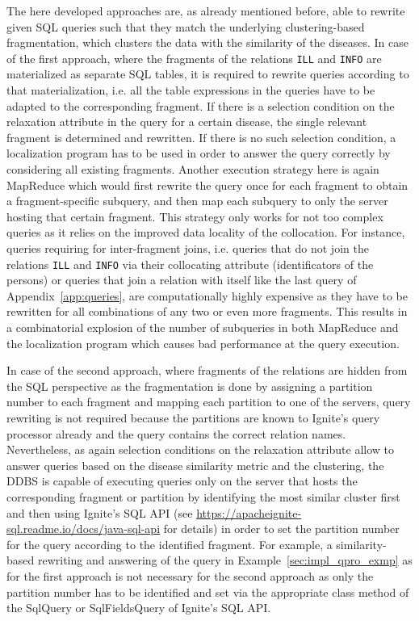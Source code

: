The here developed approaches are, as already mentioned before, able to rewrite given SQL queries such that they match the underlying clustering-based
fragmentation, which clusters the data with the similarity of the diseases. In case of the first approach, where the fragments of the relations \verb!ILL! and
\verb!INFO! are materialized as separate SQL tables, it is required to rewrite queries according to that materialization, i.e. all the table expressions in the
queries have to be adapted to the corresponding fragment. If there is a selection condition on the relaxation attribute in the query for a certain disease, the
single relevant fragment is determined and rewritten. If there is no such selection condition, a localization program has to be used in order to answer the 
query correctly by considering all existing fragments. Another execution strategy here is again MapReduce \citep{MapReduce2004} which would first rewrite the 
query once for each fragment to obtain a fragment-specific subquery, and then map each subquery to only the server hosting that certain fragment. This strategy
only works for not too complex queries as it relies on the improved data locality of the collocation. For instance, queries requiring for inter-fragment joins,
i.e. queries that do not join the relations \verb!ILL! and \verb!INFO! via their collocating attribute (identificators of the persons) or queries that join a
relation with itself like the last query of Appendix~\ref{app:queries}, are computationally highly expensive as they have to be rewritten for all combinations
of any two or even more fragments. This results in a combinatorial explosion of the number of subqueries in both MapReduce and the localization program which
causes bad performance at the query execution.

In case of the second approach, where fragments of the relations are hidden from the SQL perspective as the fragmentation is done by assigning a partition
number to each fragment and mapping each partition to one of the servers, query rewriting is not required because the partitions are known to Ignite's query
processor already and the query contains the correct relation names. Nevertheless, as again selection conditions on the relaxation attribute allow to answer
queries based on the disease similarity metric and the clustering, the DDBS is capable of executing queries only on the server that hosts the corresponding
fragment or partition by identifying the most similar cluster first and then using Ignite's SQL API (see
\url{https://apacheignite-sql.readme.io/docs/java-sql-api} for details) in order to set the partition number for the query according to the identified 
fragment. For example, a similarity-based rewriting and answering of the query in Example~\ref{sec:impl_qpro_exmp} as for the first approach is not necessary
for the second approach as only the partition number has to be identified and set via the appropriate class method of the SqlQuery or SqlFieldsQuery of 
Ignite's SQL API. 


